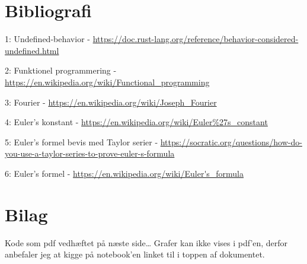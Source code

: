 \documentclass[11pt,a4paper]{article}
\begin{document}
\section{Bibliografi}
\label{sec:org4fbe7c5}

1: Undefined-behavior - \url{https://doc.rust-lang.org/reference/behavior-considered-undefined.html}

2: Funktionel programmering - \url{https://en.wikipedia.org/wiki/Functional\_programming}

3: Fourier - \url{https://en.wikipedia.org/wiki/Joseph\_Fourier}

4: Euler's konstant - \url{https://en.wikipedia.org/wiki/Euler\%27s\_constant}

5: Euler's formel bevis med Taylor serier - \url{https://socratic.org/questions/how-do-you-use-a-taylor-series-to-prove-euler-s-formula}

6: Euler's formel - \url{https://en.wikipedia.org/wiki/Euler's\_formula}

\section{Bilag}
\label{sec:org7ca7524}

Kode som pdf vedhæftet på næste side\ldots{}
Grafer kan ikke vises i pdf'en, derfor anbefaler jeg at kigge på notebook'en linket til i toppen af dokumentet.


\end{document}
